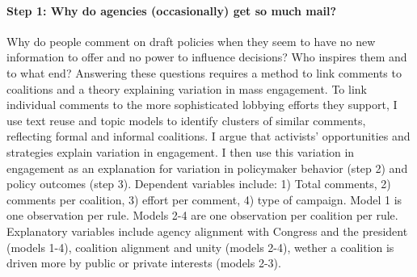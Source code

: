 \paragraph{Step 1: Why do agencies (occasionally) get so much mail?} %
Why do people comment on draft policies when they seem to have no new information to offer and no power to influence decisions? Who inspires them and to what end? 
Answering these questions requires a method to link comments to coalitions and a theory explaining variation in mass engagement.  
To link individual comments to the more sophisticated lobbying efforts they support, I use text reuse and topic models to identify clusters of similar comments, reflecting formal and informal coalitions.
I argue that activists' opportunities and strategies explain variation in engagement. %
I then use this variation in engagement as an explanation for variation in policymaker behavior (step 2) and policy outcomes (step 3). 
Dependent variables include: 
1) Total comments, %
2) comments per coalition, %
3) effort per comment, %
4) type of campaign. %
Model 1 is one observation per rule. Models 2-4 are one observation per coalition per rule. Explanatory variables include agency alignment with Congress and the president (models 1-4), coalition alignment and unity (models 2-4), wether a coalition is driven more by public or private interests (models 2-3).%


